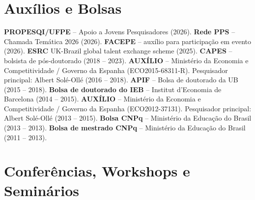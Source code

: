 \documentclass[a4paper,9pt]{article}
\begin{document}
\section{Auxílios e Bolsas}

\noindent \textbf{PROPESQI/UFPE} -- Apoio a Jovens Pesquisadores (2026). \textbf{Rede PPS} -- Chamada Temática 2026 (2026). \textbf{FACEPE} -- auxílio para participação em evento (2026). \textbf{ESRC} UK-Brazil global talent exchange scheme (2025). \textbf{CAPES} -- bolsista de pós-doutorado (2018 -- 2023). \textbf{AUXÍLIO} -- Ministério da Economia e Competitividade / Governo da Espanha (ECO2015-68311-R). Pesquisador principal: Albert Sol\'e-Oll\'e (2016 -- 2018). \textbf{APIF} -- Bolsa de doutorado da UB (2015 -- 2018). \textbf{Bolsa de doutorado do IEB} -- Institut d'Economia de Barcelona (2014 -- 2015). \textbf{AUXÍLIO} -- Ministério da Economia e Competitividade / Governo da Espanha (ECO2012-37131). Pesquisador principal: Albert Sol\'e-Oll\'e (2013 -- 2015). \textbf{Bolsa CNPq} -- Ministério da Educação do Brasil (2013 -- 2013). \textbf{Bolsa de mestrado CNPq} -- Ministério da Educação do Brasil (2011 -- 2013).

\vspace*{0.1mm}

\section{Conferências, Workshops e Seminários}
\end{document}
